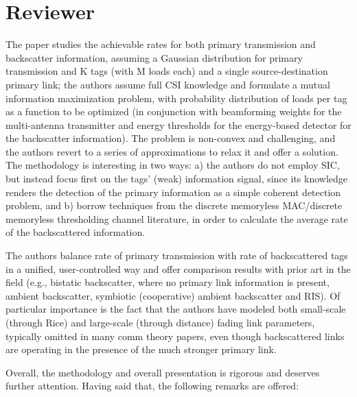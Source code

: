 \documentclass[10pt]{scrartcl}
\newcounter{rpntcnt}
\newcounter{revcnt}
\newenvironment{reviewer}{%
	\refstepcounter{revcnt}%
	\setcounter{rpntcnt}{0}%
	\section*{Reviewer \therevcnt}%
}{}
\begin{document}
\begin{reviewer}
	The paper studies the achievable rates for both primary transmission and backscatter information, assuming a Gaussian distribution for primary transmission and K tags (with M loads each) and a single source-destination primary link; the authors assume full CSI knowledge and formulate a mutual information maximization problem, with probability distribution of loads per tag as a function to be optimized (in conjunction with beamforming weights for the multi-antenna transmitter and energy thresholds for the energy-based detector for the backscatter information). The problem is non-convex and challenging, and the authors revert to a series of approximations to relax it and offer a solution. The methodology is interesting in two ways: a) the authors do not employ SIC, but instead focus first on the tags' (weak) information signal, since its knowledge renders the detection of the primary information as a simple coherent detection problem, and b) borrow techniques from the discrete memoryless MAC/discrete memoryless thresholding channel literature, in order to calculate the average rate of the backscattered information.

	The authors balance rate of primary transmission with rate of backscattered tags in a unified, user-controlled way and offer comparison results with prior art in the field (e.g., bistatic backscatter, where no primary link information is present, ambient backscatter, symbiotic (cooperative) ambient backscatter and RIS). Of particular importance is the fact that the authors have modeled both small-scale (through Rice) and large-scale (through distance) fading link parameters, typically omitted in many comm theory papers, even though backscattered links are operating in the presence of the much stronger primary link.

	Overall, the methodology and overall presentation is rigorous and deserves further attention. Having said that, the following remarks are offered:


\end{reviewer}
\end{document}
